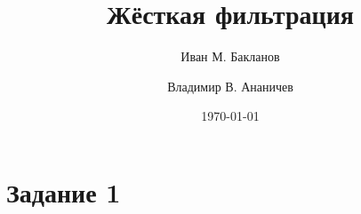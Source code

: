 \documentclass[a4paper, 12pt]{article}
\title{
Жёсткая фильтрация
}
\author{Иван М. Бакланов}
\affil{465112, ibaklanov@niuitmo.ru}
\author{Владимир В. Ананичев}
\affil{464994, vandmitrievic@mail.ru}
\date{\today}
\begin{document}
\maketitle

\tableofcontents

\newpage


\section{Задание 1}
\end{document}
